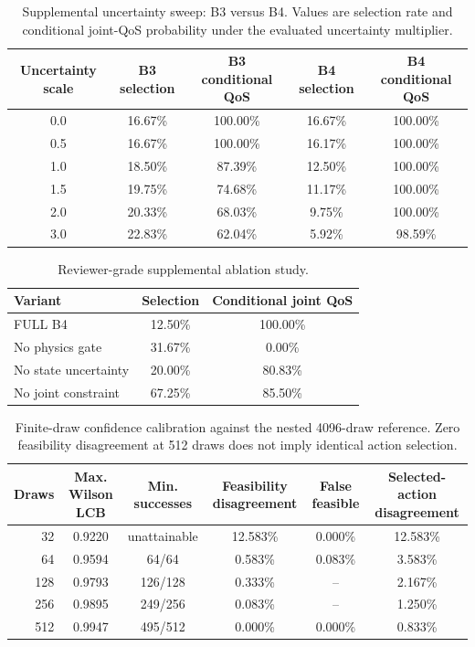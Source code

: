 \begin{table}[t]
\centering
\caption{Supplemental uncertainty sweep: B3 versus B4. Values are selection rate and conditional joint-QoS probability under the evaluated uncertainty multiplier.}
\label{tab:supp-uncertainty}
\begin{tabular}{c|cc|cc}
\hline
Uncertainty scale & B3 selection & B3 conditional QoS & B4 selection & B4 conditional QoS\\
\hline
0.0 & 16.67\% & 100.00\% & 16.67\% & 100.00\%\\
0.5 & 16.67\% & 100.00\% & 16.17\% & 100.00\%\\
1.0 & 18.50\% & 87.39\% & 12.50\% & 100.00\%\\
1.5 & 19.75\% & 74.68\% & 11.17\% & 100.00\%\\
2.0 & 20.33\% & 68.03\% & 9.75\% & 100.00\%\\
3.0 & 22.83\% & 62.04\% & 5.92\% & 98.59\%\\
\hline
\end{tabular}
\end{table}

\begin{table}[t]
\centering
\caption{Reviewer-grade supplemental ablation study.}
\label{tab:supp-ablation}
\begin{tabular}{lcc}
\hline
Variant & Selection & Conditional joint QoS\\
\hline
FULL B4 & 12.50\% & 100.00\%\\
No physics gate & 31.67\% & 0.00\%\\
No state uncertainty & 20.00\% & 80.83\%\\
No joint constraint & 67.25\% & 85.50\%\\
\hline
\end{tabular}
\end{table}

\begin{table}[t]
\centering
\caption{Finite-draw confidence calibration against the nested 4096-draw reference. Zero feasibility disagreement at 512 draws does not imply identical action selection.}
\label{tab:finite-draw-calibration}
\begin{tabular}{rccccc}
\hline
Draws & Max. Wilson LCB & Min. successes & Feasibility disagreement & False feasible & Selected-action disagreement\\
\hline
32  & 0.9220 & unattainable & 12.583\% & 0.000\% & 12.583\%\\
64  & 0.9594 & 64/64  & 0.583\% & 0.083\% & 3.583\%\\
128 & 0.9793 & 126/128 & 0.333\% & -- & 2.167\%\\
256 & 0.9895 & 249/256 & 0.083\% & -- & 1.250\%\\
512 & 0.9947 & 495/512 & 0.000\% & 0.000\% & 0.833\%\\
\hline
\end{tabular}
\end{table}

